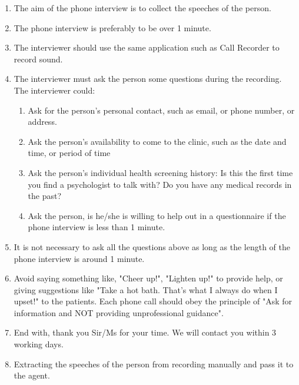\documentclass{article}
\begin{document}
   	\begin{enumerate}
    		\item The aim of the phone interview is to collect the speeches of the person.
    		\item The phone interview is preferably to be over 1 minute.
		\item The interviewer should use the same application such as Call Recorder to record sound.
		\item The interviewer must ask the person some questions during the recording. The interviewer could: 
          \begin{enumerate}
          	\item Ask for the person's personal contact, such as email, or phone number, or address.
          	\item Ask the person's availability to come to the clinic, such as the date and time, or period of time
          	\item Ask the person's individual health screening history: 
          	Is this the first time you find a psychologist to talk with? Do you have any medical records in the past?
          	\item Ask the person, is he/she is willing to help out in a questionnaire if the phone interview is less than 1 minute.
          \end{enumerate}
        \item It is not necessary to ask all the questions above as long as the length of the phone interview is around 1 minute.
        \item Avoid saying something like, "Cheer up!", "Lighten up!" to provide help, or giving suggestions like 
        		"Take a hot bath. That's what I always do when I upset!" to the patients. 
        		Each phone call should obey the principle of "Ask for information and NOT providing unprofessional guidance". \cite{PsychCentral2015}
        \item End with, thank you Sir/Ms for your time. We will contact you within 3 working days.
        \item Extracting the speeches of the person from recording manually and pass it to the agent.
	\end{enumerate}
\end{document}
